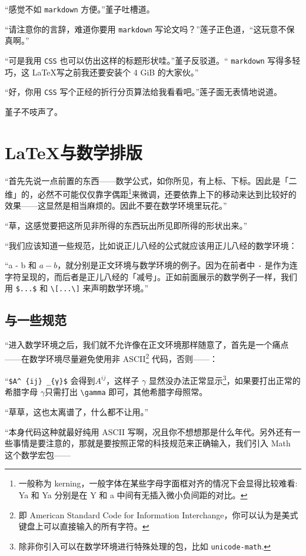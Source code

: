 “感觉不如 \verb"markdown" 方便。”堇子吐槽道。

“请注意你的言辞，难道你要用 \verb"markdown" 写论文吗？”莲子正色道，“这玩意不保真啊。”

“可是我用 \verb"CSS" 也可以仿出这样的标题形状哇。”堇子反驳道。“ \verb"markdown" 写得多轻巧，这 \LaTeX 写之前我还要安装个 4 GiB 的大家伙。”

“好，你用 \verb"CSS" 写个正经的折行分页算法给我看看吧。”莲子面无表情地说道。

堇子不吱声了。

\section{\LaTeX 与数学排版}

“首先先说一点前置的东西——数学公式，如你所见，有上标、下标。因此是「二维」的，必然不可能仅仅靠字偶距\footnote{一般称为 kerning，一般字体在某些字母字面框对齐的情况下会显得比较难看: {Y}{a} 和 Ya 分别是在 Y 和 a 中间有无插入微小负间距的对比。}来微调，还要依靠上下的移动来达到比较好的效果——这显然是相当麻烦的。因此不要在数学环境里玩花。”

“草，这感觉要把这所见非所得的东西玩出所见即所得的形状出来。”

“我们应该知道一些规范，比如说正儿八经的公式就应该用正儿八经的数学环境：

“a - b 和 $a - b$，就分别是正文环境与数学环境的例子。因为在前者中 \verb"-" 是作为连字符呈现的，而后者是正儿八经的「减号」。正如前面展示的数学例子一样，我们用 \verb"$...$" 和 \verb"\[...\]" 来声明数学环境。”

\subsection{\AmS 与一些规范}

“进入数学环境之后，我们就不允许像在正文环境那样随意了，首先是一个痛点——在数学环境尽量避免使用非 ASCII\footnote{即
    American Standard Code for Information Interchange，你可以认为是美式键盘上可以直接输入的所有字符。} 代码，否则——：

“\verb"$A^ {ij} _{γ}$" 会得到$
    A^{ij} %
$，这样子 $\gamma $ 显然没办法正常显示\footnote{除非你引入可以在数学环境进行特殊处理的包，比如 \texttt{unicode-math}.}，如果要打出正常的希腊字母 $\gamma $只需打出 \verb"\gamma" 即可，其他希腊字母照常。

“草草，这也太离谱了，什么都不让用。”

“本身代码这种就最好纯用 ASCII 写啊，况且你不想想那是什么年代。另外还有一些事情是要注意的，那就是要按照正常的科技规范来正确输入，我们引入 \AmS{}Math 这个数学宏包——

